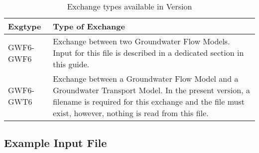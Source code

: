 \begin{table}[h]
\caption{Exchange types available in Version \modflowversion}
\small
\begin{center}
\begin{tabular*}{\columnwidth}{l p{15cm}}
\hline
\hline
Exgtype & Type of Exchange \\
\hline
GWF6-GWF6 & Exchange between two Groundwater Flow Models.  Input for this file is described in a dedicated section in this guide. \\
GWF6-GWT6 & Exchange between a Groundwater Flow Model and a Groundwater Transport Model.  In the present version, a filename is required for this exchange and the file must exist, however, nothing is read from this file.  \\
\hline 
\end{tabular*}
\label{table:exgtype}
\end{center}
\normalsize
\end{table}

\vspace{5mm}
\subsection{Example Input File}


